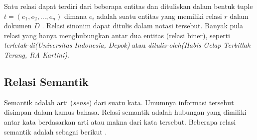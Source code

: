 Satu relasi dapat terdiri dari beberapa entitas dan dituliskan dalam bentuk tuple $t = (e_1, e_2, ..., e_n)$ dimana $e_i$ adalah suatu entitas yang memiliki relasi $r$ dalam dokumen $D$ \citep{article.backbadaskar}. Relasi sinonim dapat ditulis dalam notasi tersebut. Banyak pula relasi yang hanya menghubungkan antar dua entitas (relasi biner), seperti \textit{terletak-di(Universitas Indonesia, Depok)} atau \textit{ditulis-oleh(Habis Gelap Terbitlah Terang, RA Kartini)}.

\subsection{Relasi Semantik}
Semantik adalah arti (\textit{sense}) dari suatu kata. Umumnya informasi tersebut disimpan dalam kamus bahasa. Relasi semantik adalah hubungan yang dimiliki antar kata berdasarkan arti atau makna dari kata tersebut. Beberapa relasi semantik adalah sebagai berikut \citep{paper.miller}.
